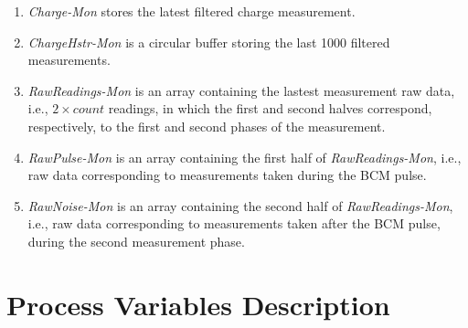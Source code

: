 \documentclass[openany]{article}
\begin{document}
		\begin{enumerate}
			\item \emph{Charge-Mon} stores the latest filtered charge measurement.
			\item \emph{ChargeHstr-Mon} is a circular buffer storing the last 1000 filtered measurements.
			\item \emph{RawReadings-Mon} is an array containing the lastest measurement raw data, i.e., $ 2 \times count $ readings, in which the first and second halves correspond, respectively, to the first and second phases of the measurement.
			\item \emph{RawPulse-Mon} is an array containing the first half of \emph{RawReadings-Mon}, i.e., raw data corresponding to measurements taken during the BCM pulse.
			\item \emph{RawNoise-Mon} is an array containing the second half of \emph{RawReadings-Mon}, i.e., raw data corresponding to measurements taken after the BCM pulse, during the second measurement phase.
		\end{enumerate}

\section{Process Variables Description}\label{sec:process-variables}
\end{document}
